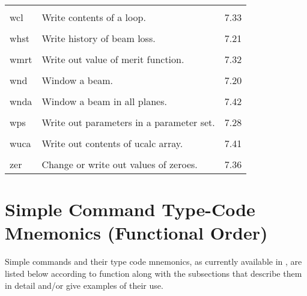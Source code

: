 \begin{center}
\begin{tabular}{lll}
\vspace{-3mm}& &\\
\hspace{1.5em}wcl   &         Write contents of a loop.            & \hspace{2em}7.33\\
\vspace{-3mm}& &\\
\hspace{1.5em}whst  &         Write history of beam loss.          & \hspace{2em}7.21\\
\vspace{-3mm}& &\\
\hspace{1.5em}wmrt  &         Write out value of merit function.   & \hspace{2em}7.32\\
\vspace{-3mm}& &\\
\hspace{1.5em}wnd  &         Window a beam.                & \hspace{2em}7.20\\
\vspace{-3mm}& &\\
\hspace{1.5em}wnda  &         Window a beam in all planes.
& \hspace{2em}7.42\\
\vspace{-3mm}& &\\
\hspace{1.5em}wps   &    Write out parameters in a parameter set.  & \hspace{2em}7.28\\
\vspace{-3mm}& &\\
\hspace{1.5em}wuca  &   Write out contents of ucalc array.       &
\hspace{2em}7.41 \\
\vspace{-3mm}& &\\
\hspace{1.5em}zer  &   Change or write out values of zeroes.       & \hspace{2em}7.36
\end{tabular}
\end{center}

\newpage
\section{Simple Command Type-Code Mnemonics \protect\newline (Functional Order)}
     Simple commands and their type code mnemonics, as currently available
in , are listed below according to function along with the
subsections that describe them in detail and/or give examples of their use.

